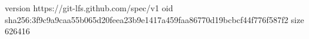 version https://git-lfs.github.com/spec/v1
oid sha256:3f9c9a9caa55b065d20feea23b9e1417a459faa86770d19bcbcf44f776f587f2
size 626416
